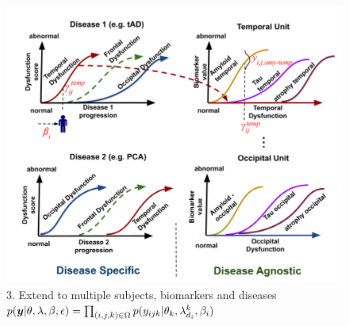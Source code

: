 \documentclass[portrait,a0,final,20pt]{a0poster}
\newcommand{\fnt}[1]{\LARGE{#1}}
\begin{document}
{\begin{multicols}{2}
\begin{figure}[H]
 \includegraphics[width=\columnwidth]{disease_knowledge_transfer_poster.pdf}
  \fnt{3. Extend to multiple subjects, biomarkers and diseases}\\
 $ p(\boldsymbol{y}|\theta, \lambda, \beta , \epsilon) = \prod_{(i,j,k) \in \Omega} p(y_{ijk}|\theta_k, \lambda_{d_i}^{k}, \beta_{i}) $
 \end{figure}


\columnbreak




\newcommand{\uu}{^{(u)}}
\newcommand{\um}{^{(u-1)}}

\newcommand{\algoFnt}[1]{\Large{#1}}



\end{multicols}}
\end{document}
